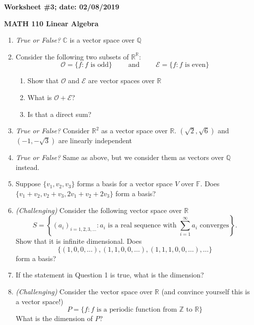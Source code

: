 \documentclass{article}
\newcommand{\ZZ}{\mathbb{Z}}
\newcommand{\RR}{\mathbb{R}}
\begin{document}
{\bf Worksheet \#3; date: 02/08/2019}

{\bf MATH 110 Linear Algebra}

\begin{enumerate}
\item {\em True or False?} $\mathbb{C}$ is a vector space over $\mathbb{Q}$

\item Consider the following two subsets of $\RR^\RR$:
\[
	\mathcal{O} = \{f: f \text{ is odd}\} \qquad \text{ and } \qquad \mathcal{E} = \{f: f \text{ is even}\}
\]
\begin{enumerate}
\item Show that $\mathcal{O}$ and $\mathcal{E}$ are vector spaces over $\RR$
\item What is $\mathcal{O} + \mathcal{E}$?
\item Is that a direct sum?
\end{enumerate}

\item {\em True or False?} Consider $\mathbb{R}^2$ as a vector space over $\mathbb{R}$. $(\sqrt{2}, \sqrt{6})$ and $(-1, -\sqrt{3})$ are linearly independent

\item {\em True or False?} Same as above, but we consider them as vectors over $\mathbb{Q}$ instead.

\item Suppose $\{v_1, v_2, v_3\}$ forms a basis for a vector space $V$ over $\mathbb{F}$. Does $\{v_1 + v_2, v_2 + v_3, 2v_1 + v_2 + 2v_3\}$ form a basis?

\item {\em (Challenging)} Consider the following vector space over $\RR$
\[
	S = \left\{(a_i)_{i = 1, 2, 3, \ldots}: a_i \text{ is a real sequence with } \sum_{i=1}^\infty a_i \text{ converges}\right\}.
\]
Show that it is infinite dimensional. Does
\[
	\{(1, 0, 0, \ldots), (1, 1, 0, 0, \ldots), (1, 1, 1, 0, 0, \ldots), \ldots\}
\]
form a basis?

\item If the statement in Question 1 is true, what is the dimension?

\item {\em (Challenging)} Consider the vector space over $\RR$ (and convince yourself this is a vector space!)
\[
	P = \{f:f \text{ is a periodic function from } \ZZ \text{ to } \RR\}
\]
What is the dimension of $P$?
\end{enumerate}
\end{document}
